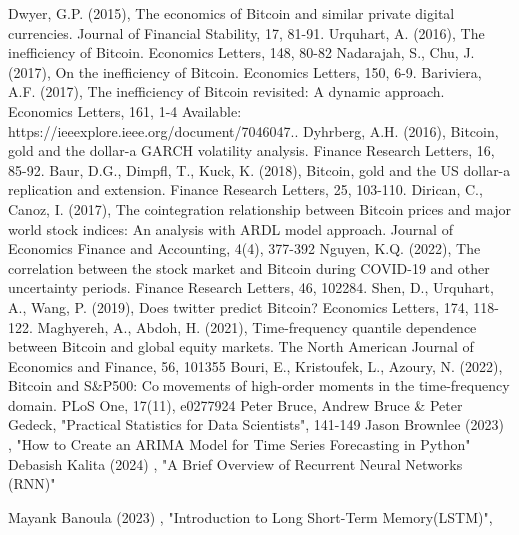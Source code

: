 \documentclass{ieeeojies}
\begin{document}
\begin{thebibliography}{00}
 Dwyer, G.P. (2015), The economics of Bitcoin and similar private digital currencies. Journal of Financial Stability, 17, 81-91.
 Urquhart, A. (2016), The inefficiency of Bitcoin. Economics Letters, 148, 80-82
 Nadarajah, S., Chu, J. (2017), On the inefficiency of Bitcoin. Economics Letters, 150, 6-9.
 Bariviera, A.F. (2017), The inefficiency of Bitcoin revisited: A dynamic approach. Economics Letters, 161, 1-4 Available: https://ieeexplore.ieee.org/document/7046047..
 Dyhrberg, A.H. (2016), Bitcoin, gold and the dollar-a GARCH volatility analysis. Finance Research Letters, 16, 85-92.
 Baur, D.G., Dimpfl, T., Kuck, K. (2018), Bitcoin, gold and the US dollar-a replication and extension. Finance Research Letters, 25, 103-110.
 Dirican, C., Canoz, I. (2017), The cointegration relationship between Bitcoin prices and major world stock indices: An analysis with ARDL 
model approach. Journal of Economics Finance and Accounting, 
4(4), 377-392
  Nguyen, K.Q. (2022), The correlation between the stock market and Bitcoin during COVID-19 and other uncertainty periods. Finance 
Research Letters, 46, 102284.
 Shen, D., Urquhart, A., Wang, P. (2019), Does twitter predict Bitcoin? Economics Letters, 174, 118-122.
 Maghyereh, A., Abdoh, H. (2021), Time-frequency quantile dependence between Bitcoin and global equity markets. The North American Journal of Economics and Finance, 56, 101355
 Bouri, E., Kristoufek, L., Azoury, N. (2022), Bitcoin and S&P500: Comovements of high-order moments in the time-frequency domain. PLoS One, 17(11), e0277924
 Peter Bruce, Andrew Bruce & Peter Gedeck, "Practical Statistics for Data Scientists", 141-149
 Jason Brownlee (2023) , "How to Create an ARIMA Model for Time Series Forecasting in Python"
 Debasish Kalita (2024) , "A Brief Overview of Recurrent Neural Networks (RNN)"

 Mayank Banoula (2023) , "Introduction to Long Short-Term Memory(LSTM)",

\end{thebibliography}


\EOD
\end{document}

